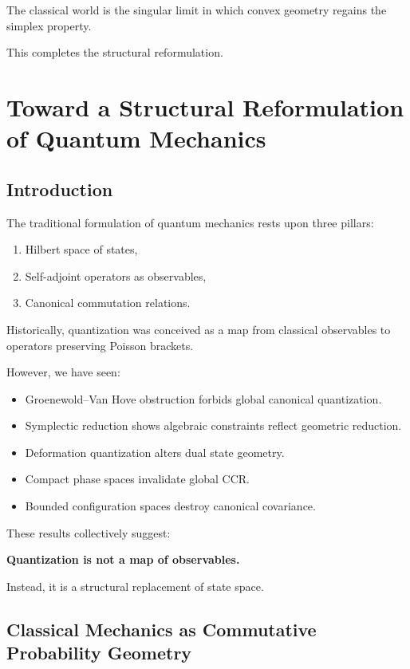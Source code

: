 \documentclass[11pt]{book}
\begin{document}
The classical world is the singular limit in which convex geometry regains the simplex property.

\bigskip

This completes the structural reformulation.
\chapter{Toward a Structural Reformulation of Quantum Mechanics}

\section{Introduction}

The traditional formulation of quantum mechanics rests upon three pillars:

\begin{enumerate}
\item Hilbert space of states,
\item Self-adjoint operators as observables,
\item Canonical commutation relations.
\end{enumerate}

Historically, quantization was conceived as a map from classical observables to operators preserving Poisson brackets.

However, we have seen:

\begin{itemize}
\item Groenewold--Van Hove obstruction forbids global canonical quantization.
\item Symplectic reduction shows algebraic constraints reflect geometric reduction.
\item Deformation quantization alters dual state geometry.
\item Compact phase spaces invalidate global CCR.
\item Bounded configuration spaces destroy canonical covariance.
\end{itemize}

These results collectively suggest:

\medskip
\noindent
\textbf{Quantization is not a map of observables.}

Instead, it is a structural replacement of state space.

\section{Classical Mechanics as Commutative Probability Geometry}
\end{document}
